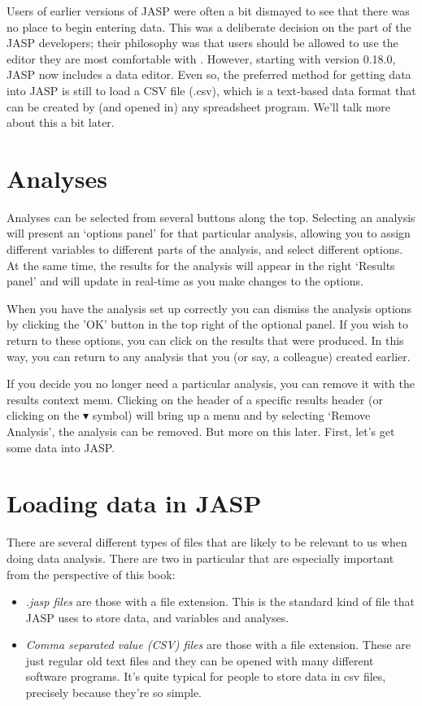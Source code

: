Users of earlier versions of JASP were often a bit dismayed to see that there was no place to begin entering data. This was a deliberate decision on the part of the JASP developers; their philosophy was that users should be allowed to use the editor they are most comfortable with . However, starting with version 0.18.0, JASP now includes a data editor. Even so, the preferred method for getting data into JASP is still to load a CSV file (.csv), which is a text-based data format that can be created by (and opened in) any spreadsheet program. We'll talk more about this a bit later.

\section{Analyses\label{sec:analyses}}

Analyses can be selected from several buttons along the top. Selecting an analysis will present an ‘options panel’ for that particular analysis, allowing you to assign different variables to different parts of the analysis, and select different options. At the same time, the results for the analysis will appear in the right ‘Results panel’ and will update in real-time as you make changes to the options.

When you have the analysis set up correctly you can dismiss the analysis options by clicking the 'OK' button in the top right of the optional panel. If you wish to return to these options, you can click on the results that were produced. In this way, you can return to any analysis that you (or say, a colleague) created earlier.

If you decide you no longer need a particular analysis, you can remove it with the results context menu. Clicking on the header of a specific results header (or clicking on the $\blacktriangledown$ symbol) will bring up a menu and by selecting ‘Remove Analysis’, the analysis can be removed. But more on this later. First, let's get some data into JASP. %

\section{Loading data in JASP\label{sec:load}}

There are several different types of files that are likely to be relevant to us when doing data analysis. There are two in particular that are especially important from the perspective of this book:
\begin{itemize}
\item {\it .jasp files} are those with a  file extension. This is the standard kind of file that JASP uses to store data, and variables and analyses. 
\item {\it Comma separated value (CSV) files} are those with a  file extension. These are just regular old text files and they can be opened with many different software programs. It's quite typical for people to store data in csv files, precisely because they're so simple.
\end{itemize} 


